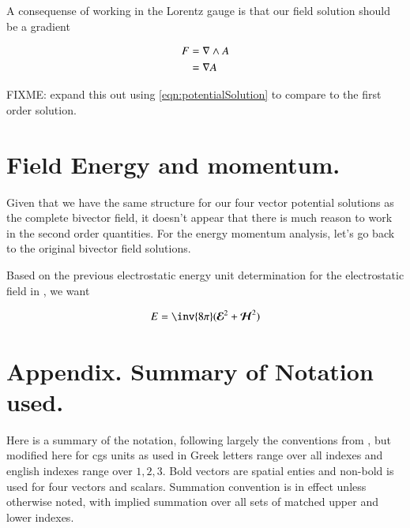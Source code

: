 \documentclass{article}
\newcommand{\EE}[0]{\boldsymbol{\mathcal{E}}}
\newcommand{\HH}[0]{\boldsymbol{\mathcal{H}}}
\begin{document}
A consequense of working in the Lorentz gauge is that our field solution should be a gradient

\begin{align*}
F 
&= \nabla \wedge A \\
&= \nabla A \\
\end{align*}


FIXME: expand this out using \ref{eqn:potentialSolution} to compare to the first order solution.

\section{ Field Energy and momentum. }

Given that we have the same structure for our four vector potential solutions as the complete bivector field, it doesn't appear that there is much
reason to work in the second order quantities.  For the energy momentum analysis, let's go back to the original bivector field solutions.

Based on the previous electrostatic energy unit determination for the electrostatic field in 
\cite{PJrayleighJeans}, we want

\begin{align*}
E = \inv{8\pi} ({\EE}^2 + \HH^2)
\end{align*}


\section{ Appendix.  Summary of Notation used. }

% 
%
Here is a summary of the notation, following largely the conventions from
\cite{doran2003gap}, but modified here for cgs units as used in \cite{bohm1989qt}
Greek letters range over all indexes and
english indexes range over $1,2,3$.  Bold vectors are spatial enties and non-bold is used for four vectors and scalars.
Summation convention is in effect unless otherwise noted, with implied summation over all sets of matched upper and lower indexes.
\end{document}
